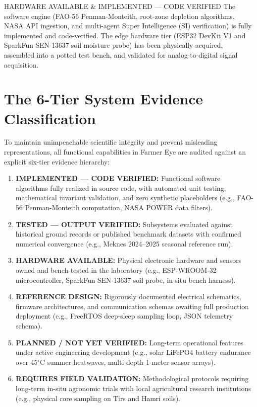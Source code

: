\documentclass[11pt,a4paper,oneside]{report}
\begin{document}
\begin{evidencebox}{HARDWARE AVAILABLE \& IMPLEMENTED — CODE VERIFIED}
The software engine (FAO-56 Penman-Monteith, root-zone depletion algorithms, NASA API ingestion, and multi-agent Super Intelligence (SI) verification) is fully implemented and code-verified. The edge hardware tier (ESP32 DevKit V1 and SparkFun SEN-13637 soil moisture probe) has been physically acquired, assembled into a potted test bench, and validated for analog-to-digital signal acquisition.
\end{evidencebox}

\section{The 6-Tier System Evidence Classification}
To maintain unimpeachable scientific integrity and prevent misleading representations, all functional capabilities in Farmer Eye are audited against an explicit six-tier evidence hierarchy:
\begin{enumerate}[leftmargin=*]
    \item \textbf{IMPLEMENTED — CODE VERIFIED:} Functional software algorithms fully realized in source code, with automated unit testing, mathematical invariant validation, and zero synthetic placeholders (e.g., FAO-56 Penman-Monteith computation, NASA POWER data filters).
    \item \textbf{TESTED — OUTPUT VERIFIED:} Subsystems evaluated against historical ground records or published benchmark datasets with confirmed numerical convergence (e.g., Meknes 2024–2025 seasonal reference run).
    \item \textbf{HARDWARE AVAILABLE:} Physical electronic hardware and sensors owned and bench-tested in the laboratory (e.g., ESP-WROOM-32 microcontroller, SparkFun SEN-13637 soil probe, in-situ bench harness).
    \item \textbf{REFERENCE DESIGN:} Rigorously documented electrical schematics, firmware architectures, and communication schemas awaiting full production deployment (e.g., FreeRTOS deep-sleep sampling loop, JSON telemetry schema).
    \item \textbf{PLANNED / NOT YET VERIFIED:} Long-term operational features under active engineering development (e.g., solar LiFePO4 battery endurance over 45$^\circ$C summer heatwaves, multi-depth 1-meter sensor arrays).
    \item \textbf{REQUIRES FIELD VALIDATION:} Methodological protocols requiring long-term in-situ agronomic trials with local agricultural research institutions (e.g., physical core sampling on Tirs and Hamri soils).
\end{enumerate}
\end{document}
